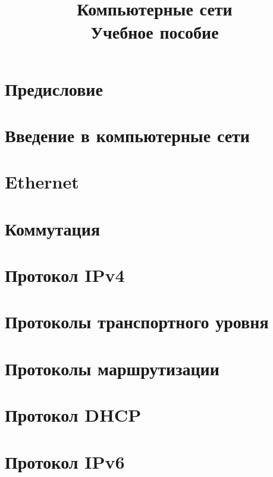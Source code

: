 \documentclass[10pt,a4paper,openany]{book}
\begin{document}
\title{Компьютерные сети \\ Учебное пособие}
\date{}
\maketitle

\theoremstyle{definition}
\newtheorem{exmp}{Пример}[section]

\usetikzlibrary{arrows,positioning} 
\tikzset{
	>=stealth',
}

\tableofcontents
\chapter*{Предисловие}

\chapter{Введение в компьютерные сети}

\chapter{Ethernet}


\chapter{Коммутация}


\chapter{Протокол IPv4}

\chapter{Протоколы транспортного уровня}


\chapter{Протоколы маршрутизации}



\chapter{Протокол DHCP}

\chapter{Протокол IPv6}




\end{document}
